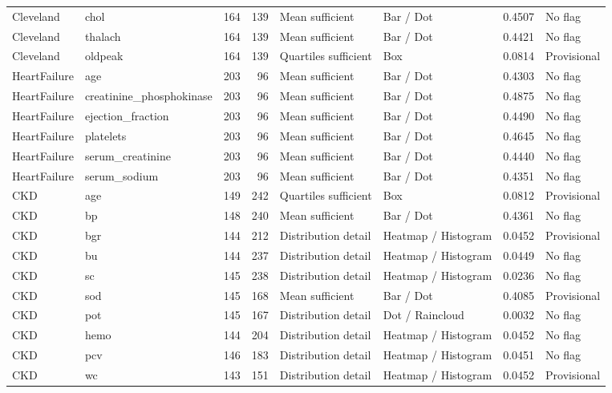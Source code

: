 \begin{longtable}{>{\raggedright\arraybackslash}p{2.5cm}>{\raggedright\arraybackslash}p{4.5cm}rr>{\raggedright\arraybackslash}p{3.0cm}>{\raggedright\arraybackslash}p{4.0cm}rp{2.0cm}}
Cleveland\cite{heart} & chol & 164 & 139 & Mean sufficient & Bar / Dot & 0.4507 & No flag\\
Cleveland\cite{heart} & thalach & 164 & 139 & Mean sufficient & Bar / Dot & 0.4421 & No flag\\
Cleveland\cite{heart} & oldpeak & 164 & 139 & Quartiles sufficient & Box & 0.0814 & Provisional\\
HeartFailure\cite{failure} & age & 203 & 96 & Mean sufficient & Bar / Dot & 0.4303 & No flag\\
HeartFailure\cite{failure} & creatinine\_phosphokinase & 203 & 96 & Mean sufficient & Bar / Dot & 0.4875 & No flag\\
HeartFailure\cite{failure} & ejection\_fraction & 203 & 96 & Mean sufficient & Bar / Dot & 0.4490 & No flag\\
HeartFailure\cite{failure} & platelets & 203 & 96 & Mean sufficient & Bar / Dot & 0.4645 & No flag\\
HeartFailure\cite{failure} & serum\_creatinine & 203 & 96 & Mean sufficient & Bar / Dot & 0.4440 & No flag\\
HeartFailure\cite{failure} & serum\_sodium & 203 & 96 & Mean sufficient & Bar / Dot & 0.4351 & No flag\\
CKD\cite{kidney} & age & 149 & 242 & Quartiles sufficient & Box & 0.0812 & Provisional\\
CKD\cite{kidney} & bp & 148 & 240 & Mean sufficient & Bar / Dot & 0.4361 & No flag\\
CKD\cite{kidney} & bgr & 144 & 212 & Distribution detail & Heatmap / Histogram & 0.0452 & Provisional\\
CKD\cite{kidney} & bu & 144 & 237 & Distribution detail & Heatmap / Histogram & 0.0449 & No flag\\
CKD\cite{kidney} & sc & 145 & 238 & Distribution detail & Heatmap / Histogram & 0.0236 & No flag\\
CKD\cite{kidney} & sod & 145 & 168 & Mean sufficient & Bar / Dot & 0.4085 & Provisional\\
CKD\cite{kidney} & pot & 145 & 167 & Distribution detail & Dot / Raincloud & 0.0032 & No flag\\
CKD\cite{kidney} & hemo & 144 & 204 & Distribution detail & Heatmap / Histogram & 0.0452 & No flag\\
CKD\cite{kidney} & pcv & 146 & 183 & Distribution detail & Heatmap / Histogram & 0.0451 & No flag\\
CKD\cite{kidney} & wc & 143 & 151 & Distribution detail & Heatmap / Histogram & 0.0452 & Provisional\\

\end{longtable}
